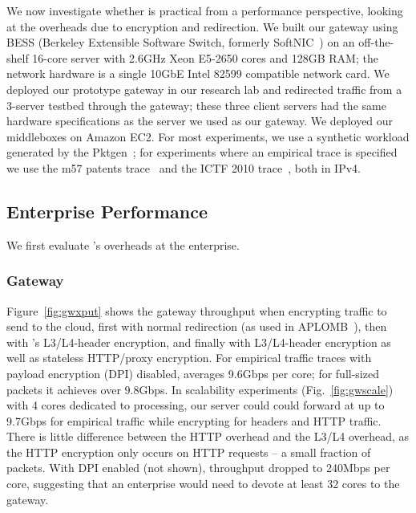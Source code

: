 We now investigate whether \sys is practical from a performance perspective, looking at the overheads due to encryption and redirection. 
We built our gateway using BESS (Berkeley Extensible Software Switch, formerly SoftNIC~\cite{softnic}) on an off-the-shelf 16-core server with 2.6GHz Xeon E5-2650 cores and 128GB RAM; the network hardware is a single 10GbE Intel 82599 compatible network card. 
We deployed our prototype gateway in our research lab and redirected traffic from a 3-server testbed through the gateway; these three client servers had the same hardware specifications as the server we used as our gateway.
We deployed our middleboxes on Amazon EC2.
For most experiments, we use a synthetic workload generated by the Pktgen~\cite{pktgen}; for experiments where an empirical trace is specified we use the m57 patents trace~\cite{m57} and the ICTF 2010 trace~\cite{ictf}, both in IPv4.


\subsection{Enterprise Performance}
\label{sec:enterprise}
We first evaluate \sys's overheads at the enterprise. %

\subsubsection{Gateway}

 
Figure~\ref{fig:gwxput} shows the gateway throughput when encrypting traffic to send to the cloud, first with normal redirection (as used in APLOMB~\cite{aplomb}), then with \sys's L3/L4-header encryption, and finally with L3/L4-header encryption as well as stateless HTTP/proxy encryption. 
For empirical traffic traces with payload encryption (DPI) disabled, \sys averages 9.6Gbps per core; for full-sized packets it achieves over 9.8Gbps.
In scalability experiments (Fig.~\ref{fig:gwscale}) with 4 cores dedicated to processing, our server could could forward at up to 9.7Gbps for empirical traffic while encrypting for headers and HTTP traffic.
There is little difference between the HTTP overhead and the L3/L4 overhead, as the HTTP encryption only occurs on HTTP requests -- a small fraction of packets. 
With DPI enabled (not shown), throughput dropped to 240Mbps per core, suggesting that an enterprise would need to devote at least 32 cores to the gateway.

